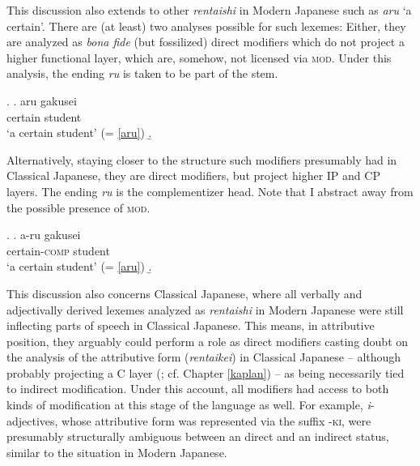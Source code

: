 \documentclass [output=book,colorlinks,citecolor=brown]{langscibook}
\begin{document}
This discussion also extends to other \textit{rentaishi} in Modern Japanese such as \textit{aru} `a certain’. There are (at least) two analyses possible for such lexemes: Either, they are analyzed as \textit{bona fide} (but fossilized) direct modifiers which do not project a higher functional layer, which are, somehow, not licensed via \textsc{mod}. Under this analysis, the ending \textit{ru} is taken to be part of the stem. %

\ex. \ag. aru gakusei\\
certain student\\
`a certain student' (= \ref{aru})
\b. 

Alternatively, staying closer to the structure such modifiers presumably had in Classical Japanese, they are direct modifiers, but project higher IP and CP layers. The ending \textit{ru} is the complementizer head. Note that I abstract away from the possible presence of \textsc{mod}.

\newpage

 \ex. \ag. a-ru gakusei\\
certain-\textsc{comp} student\\
`a certain student' (= \ref{aru})
\b. 

This discussion also concerns Classical Japanese, where all verbally and adjectivally derived lexemes analyzed as \textit{rentaishi} in Modern Japanese were still inflecting parts of speech in Classical Japanese. This means, in attributive position, they arguably could perform a role as direct modifiers casting doubt on the analysis of the attributive form (\textit{rentaikei}) in Classical Japanese -- although probably projecting a C layer (\citealt{kinsui:1995:iwayuru, kaplan:1995:the, hiraiwa:2005:dimensions}; cf. Chapter \ref{kaplan}) -- as being necessarily tied to indirect modification. Under this account, all modifiers had access to both kinds of modification at this stage of the language as well. For example, \textit{i}-adjectives, whose attributive form was represented via the suffix -\textsc{ki}, were presumably structurally ambiguous between an direct and an indirect status, similar to the situation in Modern Japanese. %
\end{document}
